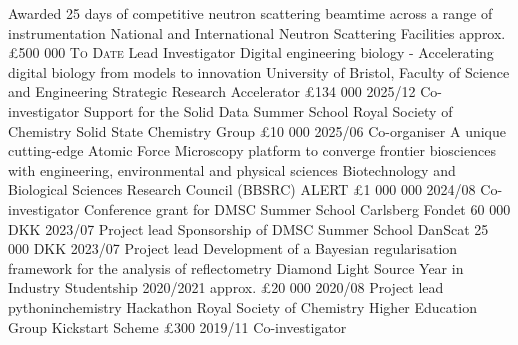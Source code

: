 \begin{monthenumerate}
  \cvfund
    {Awarded 25 days of competitive neutron scattering beamtime across a range of instrumentation}
    {National and International Neutron Scattering Facilities}
    {approx. £500 000}
    {\textsc{To Date}}
    {Lead Investigator}
  \cvfund
    {Digital engineering biology - Accelerating digital biology from models to innovation}
    {University of Bristol, Faculty of Science and Engineering Strategic Research Accelerator}
    {£134 000}
    {2025/12}
    {Co-investigator} 
  \cvfund
    {Support for the Solid Data Summer School}
    {Royal Society of Chemistry Solid State Chemistry Group}
    {£10 000}   
    {2025/06}
    {Co-organiser}
  \cvfund
    {A unique cutting-edge Atomic Force Microscopy platform to converge frontier biosciences with engineering, environmental and physical sciences}
    {Biotechnology and Biological Sciences Research Council (BBSRC) ALERT}
    {£1 000 000}
    {2024/08}
    {Co-investigator}
  \cvfund
    {Conference grant for DMSC Summer School}
    {Carlsberg Fondet}
    {60 000 DKK}  
    {2023/07}
    {Project lead}
  \cvfund
    {Sponsorship of DMSC Summer School}
    {DanScat}
    {25 000 DKK}
    {2023/07}
    {Project lead}
  \cvfund
    {Development of a Bayesian regularisation framework for the analysis of reflectometry}
    {Diamond Light Source Year in Industry Studentship 2020/2021}
    {approx. £20 000}  
    {2020/08} 
    {Project lead}
  \cvfund
    {pythoninchemistry Hackathon}
    {Royal Society of Chemistry Higher Education Group Kickstart Scheme}
    {£300}      
    {2019/11}
    {Co-investigator}
\end{monthenumerate}

